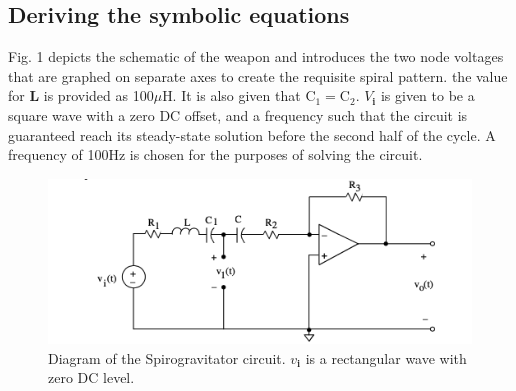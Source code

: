 \documentclass[conference]{IEEEtran}
\begin{document}
\subsection{Deriving the symbolic equations}
Fig. 1 depicts the schematic of the weapon and introduces the two node voltages that are graphed on separate axes to create the requisite spiral pattern. the value for \textbf{L} is provided as 100$\mu$H. It is also given that $\text{C}_1 = \text{C}_2$. $V_{\textbf{i}}$ is given to be a square wave with a zero DC offset, and a frequency such that the circuit is guaranteed reach its steady-state solution before the second half of the cycle. A frequency of 100Hz is chosen for the purposes of solving the circuit.
\begin{figure}[h]
    \centering
    \includegraphics[scale=.45]{fig1.png}
    \caption{Diagram of the Spirogravitator circuit. $v_{\textbf{i}}$ is a rectangular wave with zero DC level.}
    \label{fig:circuit}
\end{figure}
\end{document}
